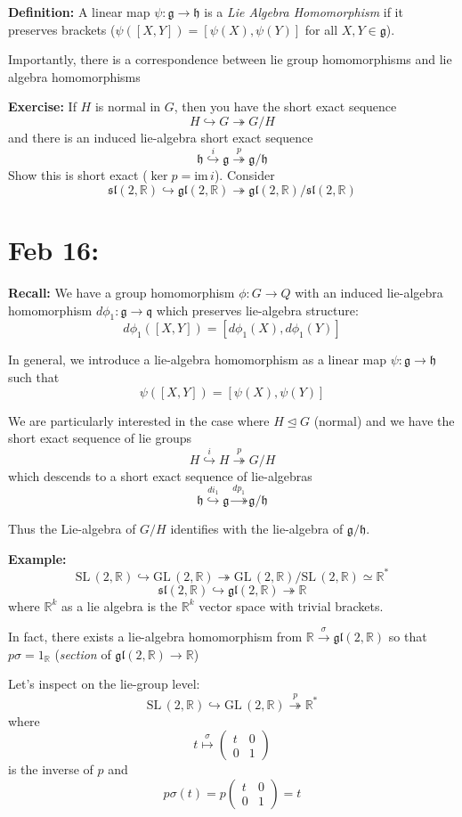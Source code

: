 \documentclass[12pt]{article}
\newcommand{\R}{\mathbb{R}}
\newcommand{\SL}{\text{SL}\,}
\newcommand{\GL}{\text{GL}\,}
\newcommand{\g}{\mathfrak{g}}
\newcommand{\h}{\mathfrak{h}}
\newcommand{\slf}{\mathfrak{sl}}
\newcommand{\glf}{\mathfrak{gl}}
\newcommand{\im}{\text{im}\,}
\begin{document}
    \textbf{Definition:} A linear map $\psi: \g \to \h$ is a \emph{Lie Algebra Homomorphism} if it preserves brackets ($\psi([X, Y]) = [\psi(X), \psi(Y)]$ for all $X, Y \in \g$).
 
    Importantly, there is a correspondence between lie group homomorphisms and lie algebra homomorphisms

    \textbf{Exercise:} If $H$ is normal in $G$, then you have the short exact sequence 
    \[H \hookrightarrow G \twoheadrightarrow G/H\]
    and there is an induced lie-algebra short exact sequence 
    \[\h \overset{i}{\hookrightarrow} \g \overset{p}{\twoheadrightarrow} \g/\h\]
    Show this is short exact ($\ker p = \im i$). Consider 
    \[\slf(2, \R) \hookrightarrow \glf(2, \R) \twoheadrightarrow \glf(2, \R)/\slf(2, \R)\]

\section{Feb 16:}
    \textbf{Recall:} We have a group homomorphism $\phi: G \to Q$ with an induced lie-algebra homomorphism $d\phi_1: \g \to \mathfrak{q}$ which preserves lie-algebra structure: 
    \[d\phi_1([X, Y]) = [d\phi_1(X), d\phi_1(Y)]\]
    
    In general, we introduce a lie-algebra homomorphism as a linear map $\psi: \g \to \h$ such that 
    \[\psi([X, Y]) = [\psi(X), \psi(Y)]\]

    We are particularly interested in the case where $H \trianglelefteq G$ (normal) and we have the short exact sequence of lie groups
    \[H \overset{i}{\hookrightarrow} H \overset{p}{\twoheadrightarrow} G/H\]
    which descends to a short exact sequence of lie-algebras 
    \[\h \overset{di_1}{\hookrightarrow} \g \overset{dp_1}{\twoheadrightarrow} \g/\h\]
    
    Thus the Lie-algebra of $G/H$ identifies with the lie-algebra of $\g/\h$. 

    \textbf{Example:}
    \[\SL(2, \R) \hookrightarrow \GL(2, \R) \twoheadrightarrow \GL(2, \R)/\SL(2, \R) \simeq \R^*\] 
    \[\slf(2, \R) \hookrightarrow \glf(2, \R) \twoheadrightarrow \R\]
    where $\R^k$ as a lie algebra is the $\R^k$ vector space with trivial brackets. 

    In fact, there exists a lie-algebra homomorphism from $\R \overset{\sigma}{\longrightarrow} \glf(2, \R)$ so that $p\sigma = 1_{\R}$ (\emph{section} of $\glf(2, \R) \to \R$)

    Let's inspect on the lie-group level:
    \[\SL(2, \R) \hookrightarrow \GL(2, \R) \overset{p}{\twoheadrightarrow} \R^*\] 
    where 
    \[t \overset{\sigma}{\mapsto} \begin{pmatrix}
        t & 0\\ 
        0 & 1
    \end{pmatrix}\]
    is the inverse of $p$ and 
    \[p\sigma(t) = p\begin{pmatrix}
        t & 0\\ 
        0 & 1
    \end{pmatrix} = t\]
\end{document}
